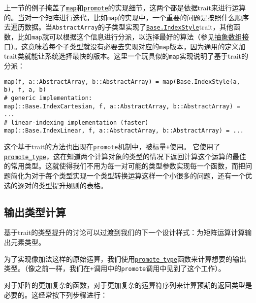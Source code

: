 上一节的例子掩盖了\hyperlink{11483231213869150535}{\texttt{map}}和\hyperlink{1760874576431605095}{\texttt{promote}}的实现细节，这两个都是依据trait来进行运算的。当对一个矩阵进行迭代，比如\texttt{map}的实现中，一个重要的问题是按照什么顺序去遍历数据。当\texttt{AbstractArray}的子类型实现了\hyperlink{7782790551324367092}{\texttt{Base.IndexStyle}}trait，其他函数，比如\texttt{map}就可以根据这个信息进行分派，以选择最好的算法（参见\hyperlink{9718377734213742156}{抽象数组接口}）。这意味着每个子类型就没有必要去实现对应的\texttt{map}版本，因为通用的定义加trait类就能让系统选择最快的版本。这里一个玩具似的\texttt{map}实现说明了基于trait的分派：




\begin{verbatim}
map(f, a::AbstractArray, b::AbstractArray) = map(Base.IndexStyle(a, b), f, a, b)
# generic implementation:
map(::Base.IndexCartesian, f, a::AbstractArray, b::AbstractArray) = ...
# linear-indexing implementation (faster)
map(::Base.IndexLinear, f, a::AbstractArray, b::AbstractArray) = ...
\end{verbatim}



这个基于trait的方法也出现在\hyperlink{1760874576431605095}{\texttt{promote}}机制中，被标量\texttt{+}使用。 它使用了\hyperlink{15048881762587391286}{\texttt{promote\_type}}，这在知道两个计算对象的类型的情况下返回计算这个运算的最佳的常用类型。这就使得我们不用为每一对可能的类型参数实现每一个函数，而把问题简化为对于每个类型实现一个类型转换运算这样一个小很多的问题，还有一个优选的逐对的类型提升规则的表格。



\hypertarget{8273619992944815153}{}


\subsection{输出类型计算}



基于trait的类型提升的讨论可以过渡到我们的下一个设计样式：为矩阵运算计算输出元素类型。



为了实现像加法这样的原始运算，我们使用\hyperlink{15048881762587391286}{\texttt{promote\_type}}函数来计算想要的输出类型。（像之前一样，我们在\texttt{+}调用中的\texttt{promote}调用中见到了这个工作）。



对于矩阵的更加复杂的函数，对于更加复杂的运算符序列来计算预期的返回类型是必要的。这经常按下列步骤进行：



